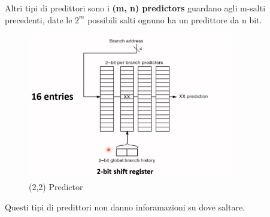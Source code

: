 \documentclass[12pt]{article}
\begin{document}
Altri tipi di predittori sono i \textbf{(m, n) predictors} guardano agli m-salti precedenti, date le $2^{m}$ possibili salti ognuno ha un predittore da n bit.
\begin{figure}[H]
    \centering
    \includegraphics[width=0.8\textwidth]{predictor.png}
    \caption{(2,2) Predictor}
    \label{fig:predictor}
\end{figure}
Questi tipi di predittori non danno inforamazioni su dove saltare.
\end{document}
